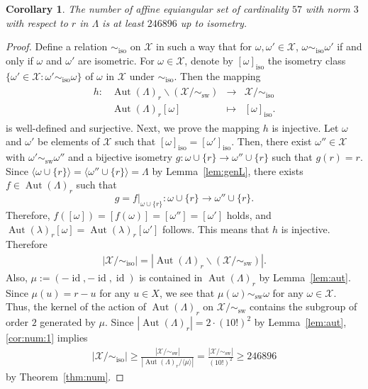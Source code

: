 \documentclass[reqno, 11pt]{amsart}
\numberwithin{equation}{section}
\newtheorem{cor}[lem]{Corollary}%
\theoremstyle{definition}
\DeclareMathOperator{\Aut}{Aut}
\DeclareMathOperator{\id}{id}
\DeclareMathOperator{\sw}{sw}
\DeclareMathOperator{\iso}{iso}
\newcommand{\aes}{\omega}
\newcommand{\cX}{\mathcal{X}}
\newcommand{\sr}{ r } %
\begin{document}
\begin{cor}	\label{cor:num}
	The number of affine equiangular set of cardinality $57$ with norm $3$ with respect to $\sr$ in $\Lambda$ is at least $246896$ up to isometry.
\end{cor}
\begin{proof}
	Define a relation $\sim_{\iso}$ on $\cX$ in such a way that for $\aes, \aes' \in \cX$, $\aes \sim_{\iso} \aes'$ if and only if $\aes$ and $\aes'$ are isometric.
	For $\aes \in \cX$, denote by $[\aes]_{\iso}$ the isometry class $\{ \aes' \in \cX : \aes' \sim_{\iso} \aes\}$ of $\aes$ in $\cX$ under $\sim_{\iso}$.
	Then the mapping
	\begin{align*}
		\begin{array}{rccc}
			h : & \Aut(\Lambda)_r \backslash \left( \cX / \sim_{\sw} \right) & \to     & \cX/ \sim_{\iso} \\
			    & \Aut(\Lambda)_r [\aes]                                     & \mapsto & [\aes]_{\iso}.
		\end{array}
	\end{align*}
	is well-defined and surjective.
	Next, we prove the mapping $h$ is injective.
	Let $\aes$ and $\aes'$ be elements of $\cX$ such that $[\aes]_{\iso} = [\aes']_{\iso}$.
	Then, there exist $\aes'' \in \cX$ with $\aes' \sim_{\sw} \aes''$ and a bijective isometry $g : \aes \cup \{r\} \to \aes'' \cup \{r \}$ such that $g(r) = r$.
	Since $\langle \aes \cup \{r\} \rangle = \langle \aes'' \cup \{ r \} \rangle = \Lambda$ by Lemma~\ref{lem:genL}, there exists $f \in \Aut(\Lambda)_r$ such that $$g =  f |_{\aes \cup \{ r \}} : \aes \cup \{ r \} \to \aes'' \cup \{ r \}.$$
	Therefore, $f([\aes]) = [f(\aes)] = [\aes''] = [\aes']$ holds, and $\Aut(\lambda)_r[\aes] = \Aut(\lambda)_r[\aes']$ follows.
	This means that $h$ is injective.
	Therefore
	\begin{align}	\label{cor:num:1}
		\left| \cX/ \sim_{\iso} \right|
		= \left| \Aut(\Lambda)_r \backslash \left( \cX / \sim_{\sw} \right) \right|.
	\end{align}
	Also, $\mu := (-\id,-\id, \id)$ is contained in $\Aut(\Lambda)_r$ by Lemma~\ref{lem:aut}.
	Since $\mu(u) = r - u$ for any $u \in X$, we see that $\mu(\aes) \sim_{\sw} \aes$ for any $\aes \in \cX$.
	Thus, the kernel of the action of $\Aut(\Lambda)_{r}$ on $\cX / \sim_{\sw}$ contains the subgroup of order $2$ generated by $\mu$.
	Since $|\Aut(\Lambda)_r| = 2 \cdot (10!)^2$ by Lemma~\ref{lem:aut}, %
	\eqref{cor:num:1}  implies
	\begin{align}	\label{cor:num:2}
		\left| \cX/ \sim_{\iso} \right|
		\geq \frac{ | \cX / \sim_{\sw} | }{\left| \Aut(\Lambda)_r/ \langle \mu \rangle \right|} 
		= \frac{ | \cX / \sim_{\sw} | }{(10!)^2} 
		\geq 246896
	\end{align}
	by Theorem~\ref{thm:num}.
\end{proof}
\end{document}

